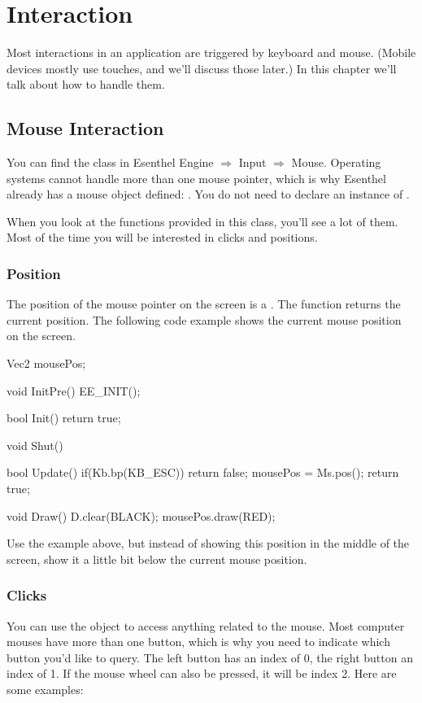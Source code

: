 \chapter{Interaction}
Most interactions in an application are triggered by keyboard and mouse. (Mobile devices mostly use touches, and we'll discuss those later.) In this chapter we'll talk about how to handle them.

\section{Mouse Interaction}
You can find the class  in Esenthel Engine $\Rightarrow$ Input $\Rightarrow$ Mouse. Operating systems cannot handle more than one mouse pointer, which is why Esenthel already has a mouse object defined: . You do not need to declare an instance of .

When you look at the functions provided in this class, you'll see a lot of them. Most of the time you will be interested in clicks and positions.

\subsection{Position}
The position of the mouse pointer on the screen is a . The function  returns the current position. The following code example shows the current mouse position on the screen. 


\begin{code}
Vec2 mousePos;

void InitPre()
{
   EE_INIT();
}

bool Init()
{   
   return true;
}

void Shut() {}

bool Update()
{
   if(Kb.bp(KB_ESC)) return false;  
   mousePos = Ms.pos();  
   return true;
}

void Draw()
{
   D.clear(BLACK);
   mousePos.draw(RED);
}
\end{code}

\begin{exercise}
Use the example above, but instead of showing this position in the middle of the screen, show it a little bit below the current mouse position.
\end{exercise} 

\subsection{Clicks}
You can use the  object to access anything related to the mouse. Most computer mouses have more than one button, which is why you need to indicate which button you'd like to query. The left button has an index of 0, the right button an index of 1. If the mouse wheel can also be pressed, it will be index 2. Here are some examples: 


